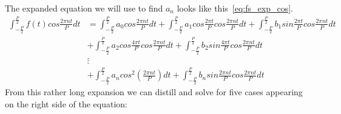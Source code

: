 \documentclass{article}
\begin{document}
    The expanded equation we will use to find $a_n$ looks like this~\eqref{eq:fs_exp_cos}.
    \begin{equation}\label{eq:fs_exp_cos}
    \begin{split}
        \int_{-\frac{P}{2}}^{\frac{P}{2}}f(t)cos\frac{2\pi nt}{P}dt 
        & = \int_{-\frac{P}{2}}^{\frac{P}{2}}a_0cos\frac{2\pi nt}{P}dt+ 
        \int_{-\frac{P}{2}}^{\frac{P}{2}}a_1cos\frac{2\pi t}{P}cos\frac{2\pi nt}{P}dt +
        \int_{-\frac{P}{2}}^{\frac{P}{2}}b_1sin\frac{2\pi t}{P}cos\frac{2\pi nt}{P}dt \\
        & + \int_{-\frac{P}{2}}^{\frac{P}{2}}a_2cos\frac{4\pi t}{P}cos\frac{2\pi nt}{P}dt +
        \int_{-\frac{P}{2}}^{\frac{P}{2}}b_2sin\frac{4\pi t}{P}cos\frac{2\pi nt}{P}dt \\
        & \vdots \\
        & + \int_{-\frac{P}{2}}^{\frac{P}{2}}a_ncos^2(\frac{2\pi nt}{P})dt +
        \int_{-\frac{P}{2}}^{\frac{P}{2}}b_nsin\frac{2\pi nt}{P}cos\frac{2\pi nt}{P}dt 
    \end{split}
    \end{equation}
    From this rather long expansion we can distill and solve for five cases appearing
    on the right side of the equation:
\end{document}
